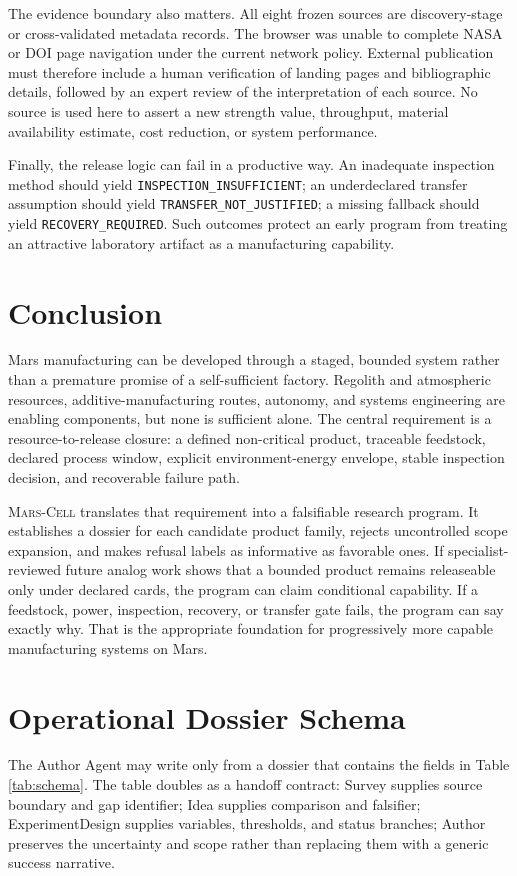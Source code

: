 \documentclass[conference]{../../../../Conference-LaTeX-template_10-17-19/IEEEtran}
\newcommand{\marscell}{\textsc{Mars-Cell}}
\begin{document}
The evidence boundary also matters. All eight frozen sources are discovery-stage or cross-validated metadata records. The browser was unable to complete NASA or DOI page navigation under the current network policy. External publication must therefore include a human verification of landing pages and bibliographic details, followed by an expert review of the interpretation of each source. No source is used here to assert a new strength value, throughput, material availability estimate, cost reduction, or system performance.

Finally, the release logic can fail in a productive way. An inadequate inspection method should yield \texttt{INSPECTION\_INSUFFICIENT}; an underdeclared transfer assumption should yield \texttt{TRANSFER\_NOT\_JUSTIFIED}; a missing fallback should yield \texttt{RECOVERY\_REQUIRED}. Such outcomes protect an early program from treating an attractive laboratory artifact as a manufacturing capability.

\section{Conclusion}
Mars manufacturing can be developed through a staged, bounded system rather than a premature promise of a self-sufficient factory. Regolith and atmospheric resources, additive-manufacturing routes, autonomy, and systems engineering are enabling components, but none is sufficient alone. The central requirement is a resource-to-release closure: a defined non-critical product, traceable feedstock, declared process window, explicit environment-energy envelope, stable inspection decision, and recoverable failure path.

\marscell{} translates that requirement into a falsifiable research program. It establishes a dossier for each candidate product family, rejects uncontrolled scope expansion, and makes refusal labels as informative as favorable ones. If specialist-reviewed future analog work shows that a bounded product remains releaseable only under declared cards, the program can claim conditional capability. If a feedstock, power, inspection, recovery, or transfer gate fails, the program can say exactly why. That is the appropriate foundation for progressively more capable manufacturing systems on Mars.

\appendices
\section{Operational Dossier Schema}
The Author Agent may write only from a dossier that contains the fields in Table \ref{tab:schema}. The table doubles as a handoff contract: Survey supplies source boundary and gap identifier; Idea supplies comparison and falsifier; ExperimentDesign supplies variables, thresholds, and status branches; Author preserves the uncertainty and scope rather than replacing them with a generic success narrative.
\end{document}
